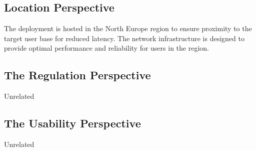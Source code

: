 \subsection{Location Perspective}
The deployment is hosted in the North Europe region to ensure proximity to the target user base for reduced latency. The network infrastructure is designed to provide optimal performance and reliability for users in the region.

\subsection{The Regulation Perspective}
Unrelated

\subsection{The Usability Perspective}
Unrelated

